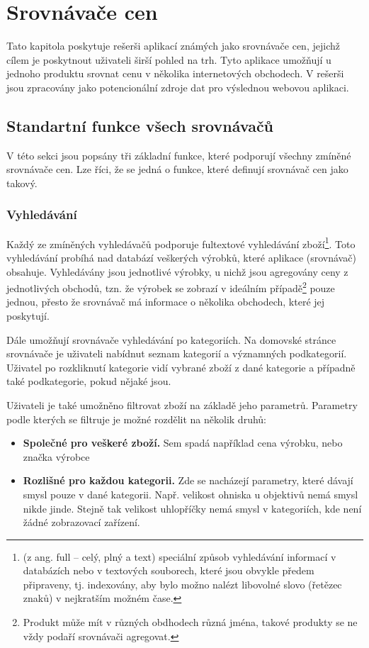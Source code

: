 \section{Srovnávače cen}
\label{sec:srovnavace-cen}
Tato kapitola poskytuje rešerši aplikací známých jako srovnávače cen, jejichž cílem je poskytnout uživateli širší pohled na trh. Tyto aplikace umožňují u jednoho produktu srovnat cenu v několika internetových obchodech. V rešerši jsou zpracovány jako potencionální zdroje dat pro výslednou webovou aplikaci.

\subsection{Standartní funkce všech srovnávačů}
V této sekci jsou popsány tři základní funkce, které podporují všechny zmíněné srovnávače cen. Lze říci, že se jedná o funkce, které definují srovnávač cen jako takový.

\subsubsection{Vyhledávání}
Každý ze zmíněných vyhledávačů podporuje fultextové vyhledávání zboží\footnote{(z ang. full – celý, plný a text) speciální způsob vyhledávání informací v databázích nebo v textových souborech, které jsou obvykle předem připraveny, tj. indexovány, aby bylo možno nalézt libovolné slovo (řetězec znaků) v nejkratším možném čase.}. Toto vyhledávání probíhá nad databází veškerých výrobků, které aplikace (srovnávač) obsahuje. Vyhledávány jsou jednotlivé výrobky, u nichž jsou agregovány ceny z jednotlivých obchodů, tzn. že výrobek se zobrazí v ideálním případě\footnote{Produkt může mít v různých obdhodech různá jména, takové produkty se ne vždy podaří srovnávači agregovat.} pouze jednou, přesto že srovnávač má informace o několika obchodech, které jej poskytují.

Dále umožňují srovnávače vyhledávání po kategoriích. Na domovské stránce srovnávače je uživateli nabídnut seznam kategorií a významných podkategorií. Uživatel po rozkliknutí kategorie vidí vybrané zboží z dané kategorie a případně také podkategorie, pokud nějaké jsou.

Uživateli je také umožněno filtrovat zboží na základě jeho parametrů. Parametry podle kterých se filtruje je možné rozdělit na několik druhů:
\begin{itemize}
\item \textbf{Společné pro veškeré zboží.} Sem spadá například cena výrobku, nebo značka výrobce
\item \textbf{Rozlišné pro každou kategorii.} Zde se nacházejí parametry, které dávají smysl pouze v dané kategorii. Např. velikost ohniska u objektivů nemá smysl nikde jinde. Stejně tak velikost uhlopříčky nemá smysl v kategoriích, kde není žádné zobrazovací zařízení.
\end{itemize}

